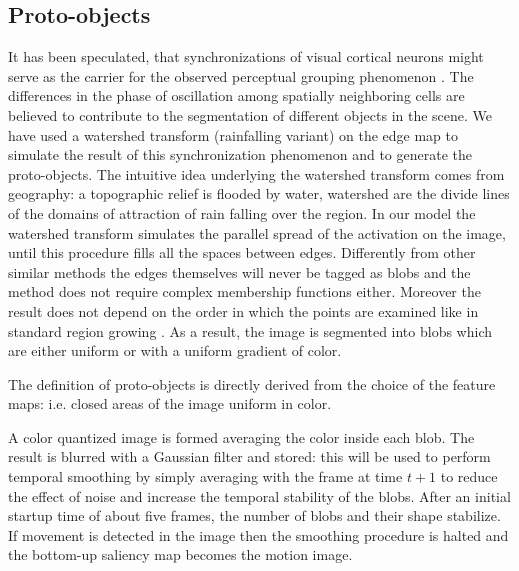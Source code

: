 \documentclass{llncs}
\begin{document}
\subsection{Proto-objects}
\label{sec:att_protoobj}
It has been speculated, that synchronizations of visual
cortical neurons might serve as the carrier for the
observed perceptual grouping phenomenon \cite{EckhornBJBKMR88,GrayKES89}.
The differences in the phase of oscillation among
spatially neighboring cells are believed to contribute to
the segmentation of different objects in the scene.
We have used a watershed transform (rainfalling
variant) \cite{Smet00} on the edge map to simulate the result of
this synchronization phenomenon and to generate the
proto-objects.
The intuitive idea underlying the watershed transform comes from
geography: a topographic relief is flooded by water,
watershed are the divide lines of the domains of
attraction of rain falling over the region. In our model
the watershed transform simulates the parallel spread
of the activation on the image, until this procedure fills
all the spaces between edges. Differently from other
similar methods the edges themselves will never be
tagged as blobs and the method does not require
complex membership functions either. Moreover the
result does not depend on the order in which the points
are examined like in standard region growing \cite{WanH03}. As
a result, the image is segmented into blobs which are
either uniform or with a uniform gradient of color. 

The definition
of proto-objects is directly derived from the choice
of the feature maps: i.e. closed areas of the image uniform in color.

A color quantized image is formed averaging the color inside
each blob. The result is blurred with a
Gaussian filter and stored: this will be used to perform
temporal smoothing by simply averaging with the frame
at time $t+1$ to reduce the effect of noise and increase
the temporal stability of the blobs. After an initial
startup time of about five frames, the number of blobs
and their shape stabilize. If movement is detected in
the image then the smoothing procedure is halted and the
bottom-up saliency map becomes the motion image.
\end{document}
